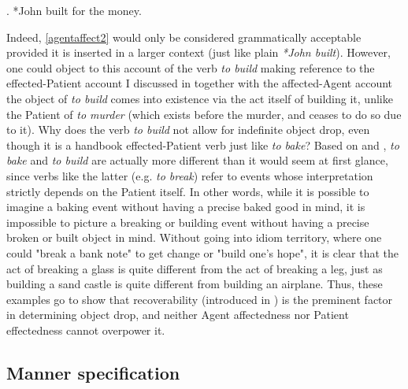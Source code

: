 \ex. \label{agentaffect2} *John built for the money.

Indeed, \ref{agentaffect2} would only be considered grammatically acceptable provided it is inserted in a larger context (just like plain \textit{*John built}). However, one could object to this account of the verb \textit{to build} making reference to the effected-Patient account I discussed in  together with the affected-Agent account \textemdash the object of \textit{to build} comes into existence via the act itself of building it, unlike the Patient of \textit{to murder} (which exists before the murder, and ceases to do so due to it). Why does the verb \textit{to build} not allow for indefinite object drop, even though it is a handbook effected-Patient verb just like \textit{to bake}? Based on \textcite[512]{Goldberg2001} and \textcite[139]{Naess2007}, \textit{to bake} and \textit{to build} are actually more different than it would seem at first glance, since verbs like the latter (e.g. \textit{to break}) refer to events whose interpretation strictly depends on the Patient itself. In other words, while it is possible to imagine a baking event without having a precise baked good in mind, it is impossible to picture a breaking or building event without having a precise broken or built object in mind. Without going into idiom territory, where one could "break a bank note" to get change or "build one's hope", it is clear that the act of breaking a glass is quite different from the act of breaking a leg, just as building a sand castle is quite different from building an airplane. Thus, these examples go to show that recoverability (introduced in ) is the preminent factor in determining object drop, and neither Agent affectedness nor Patient effectedness cannot overpower it.


\subsection{Manner specification} 

